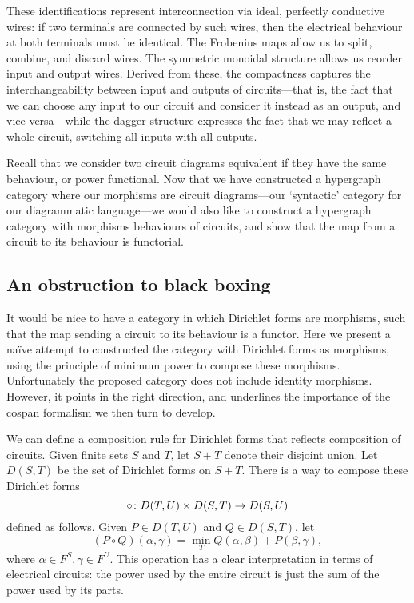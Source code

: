 These identifications represent interconnection via ideal, perfectly conductive
wires: if two terminals are connected by such wires, then the electrical
behaviour at both terminals must be identical. The Frobenius maps allow us to
split, combine, and discard wires.  The symmetric monoidal structure allows
us reorder input and output wires. Derived from these, the compactness captures the
interchangeability between input and outputs of circuits---that is, the fact
that we can choose any input to our circuit and consider it instead as an
output, and vice versa---while the dagger structure expresses the fact that we
may reflect a whole circuit, switching all inputs with all outputs.

Recall that we consider two circuit diagrams equivalent if they have the same
behaviour, or power functional. Now that we have constructed a hypergraph
category where our morphisms are circuit diagrams---our `syntactic' category for
our diagrammatic language---we would also like to construct a hypergraph
category with morphisms behaviours of circuits, and show that the map from a
circuit to its behaviour is functorial.


\subsection{An obstruction to black boxing} \label{ssec.noidentities}

It would be nice to have a category in which Dirichlet forms are morphisms, such
that the map sending a circuit to its behaviour is a functor.  Here we present a
na\"ive attempt to constructed the category with Dirichlet forms as morphisms,
using the principle of minimum power to compose these morphisms.  Unfortunately
the proposed category does not include identity morphisms.  However, it points
in the right direction, and underlines the importance of the cospan formalism we
then turn to develop.

We can define a composition rule for Dirichlet forms that reflects composition
of circuits.  Given finite sets $S$ and $T$, let $S+T$ denote their disjoint
union.  Let $D(S,T)$ be the set of Dirichlet forms on $S+T$. There is a way to
compose these Dirichlet forms
\[ 
\circ {\colon} D(T,U) \times D(S,T) \to D(S,U) 
\]
defined as follows.  Given $P \in D(T,U)$ and $Q \in D(S,T)$, let
\[ 
  (P \circ Q)(\alpha, \gamma) = \min_{T} Q(\alpha, \beta) + P(\beta, \gamma),
\]
where $\alpha \in F^S, \gamma \in F^U$. This operation has a clear
interpretation in terms of electrical circuits: the power used by the entire
circuit is just the sum of the power used by its parts. 

